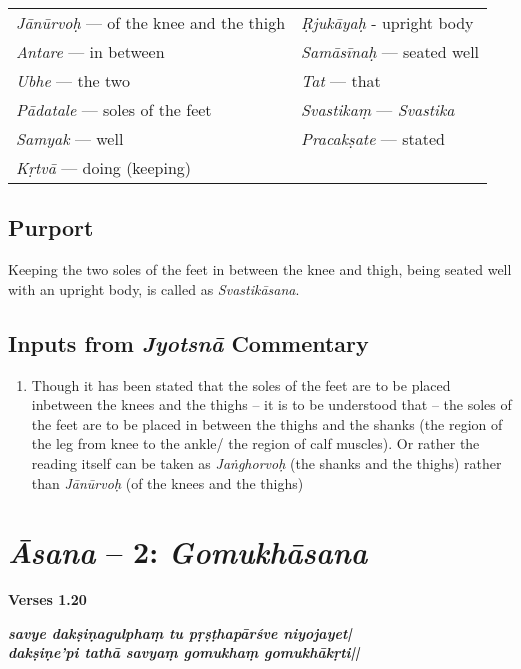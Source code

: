 \begin{longtable}{>{\noindent\raggedright}p{5cm}>{\noindent\raggedright}p{5cm}}
\textit{Jānūrvoḥ} --- of the knee and the thigh & \textit{Ṛjukāyaḥ} - upright body\tabularnewline
\textit{Antare} --- in  between & \textit{Samāsīnaḥ} --- seated well\tabularnewline
\textit{Ubhe} --- the two & \textit{Tat} --- that\tabularnewline
\textit{Pādatale} --- soles of the feet & \textit{Svastikaṃ} --- \textit{Svastika}\tabularnewline
\textit{Samyak} --- well & \textit{Pracakṣate} --- stated\tabularnewline
\textit{Kṛtvā} --- doing (keeping) & 
\end{longtable}
\vspace{-5pt}

\subsection*{Purport}

\vspace{-10pt}

Keeping the two soles of the feet in between the knee and thigh, being seated well with an upright body, is called as \textit{Svastikāsana}.

\subsection*{Inputs from \textit{Jyotsnā} Commentary}

\begin{enumerate}
\item Though it has been stated that the soles of the feet are to be placed inbetween the knees and the thighs – it is to be understood that – the soles of the feet are to be placed in between the thighs and the shanks (the region of the leg from knee to the ankle/ the region of calf muscles). Or rather the reading itself can be taken as \textit{Jaṅghorvoḥ} (the shanks and the thighs) rather than \textit{Jānūrvoḥ} (of the knees and the thighs)
\end{enumerate}

\section*{\textit{Āsana} -- 2: \textit{Gomukhāsana}}

\noindent \textbf{Verses 1.20}

\begin{shloka}
\textit{\textbf{savye dakṣiṇagulphaṃ tu pṛṣṭhapārśve niyojayet|}\\
\textbf{dakṣiṇe'pi tathā savyaṃ gomukhaṃ gomukhākṛti||}}
\end{shloka}


